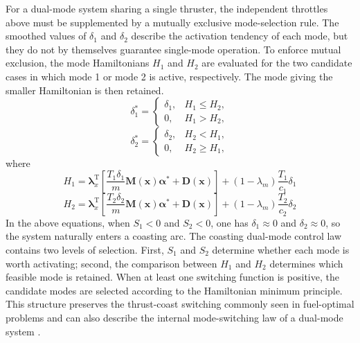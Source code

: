 ﻿\documentclass{IEEEtaes}
\begin{document}
For a dual-mode system sharing a single thruster, the independent throttles above must be supplemented by a mutually exclusive mode-selection rule. The smoothed values of $\delta_1$ and $\delta_2$ describe the activation tendency of each mode, but they do not by themselves guarantee single-mode operation. To enforce mutual exclusion, the mode Hamiltonians $H_1$ and $H_2$ are evaluated for the two candidate cases in which mode 1 or mode 2 is active, respectively. The mode giving the smaller Hamiltonian is then retained.
\begin{equation}
\delta_1^{*}=\begin{cases}
\delta_1, & H_1\leq H_2,\\
0, & H_1>H_2,
\end{cases}
\end{equation}
\begin{equation}
\delta_2^{*}=\begin{cases}
\delta_2, & H_2<H_1,\\
0, & H_2\geq H_1,
\end{cases}
\end{equation}
where
\begin{equation}
H_1=\bm{\lambda}_x^{\mathrm{T}}\left[\frac{T_1\delta_1}{m}\bm{M}(\bm{x})\bm{\alpha}^{*}+\bm{D}(\bm{x})\right]+(1-\lambda_m)\frac{T_1}{c_1}\delta_1
\end{equation}
\begin{equation}
H_2=\bm{\lambda}_x^{\mathrm{T}}\left[\frac{T_2\delta_2}{m}\bm{M}(\bm{x})\bm{\alpha}^{*}+\bm{D}(\bm{x})\right]+(1-\lambda_m)\frac{T_2}{c_2}\delta_2
\end{equation}
In the above equations, when $S_1<0$ and $S_2<0$, one has $\delta_1\approx0$ and $\delta_2\approx0$, so the system naturally enters a coasting arc. The coasting dual-mode control law contains two levels of selection. First, $S_1$ and $S_2$ determine whether each mode is worth activating; second, the comparison between $H_1$ and $H_2$ determines which feasible mode is retained. When at least one switching function is positive, the candidate modes are selected according to the Hamiltonian minimum principle. This structure preserves the thrust-coast switching commonly seen in fuel-optimal problems and can also describe the internal mode-switching law of a dual-mode system \cite{cline2024a,huang2026}.
\end{document}
